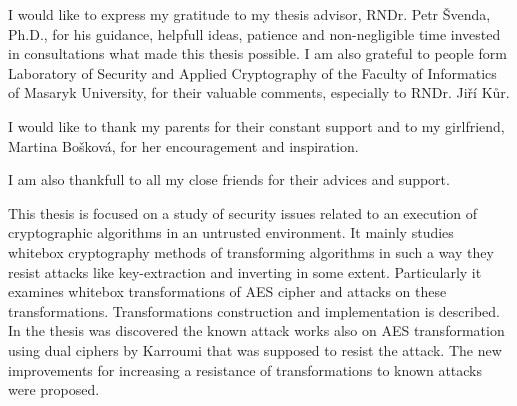 \documentclass[11pt,oneside,final]{fithesis2}
\begin{document}
\newenvironment{atribut_description}
{\begin{description}
  \renewcommand{\makelabel}[1]{\texttt{\hspace{6pt}##1 $-$}}%
  \setlength{\itemsep}{1pt}
  \setlength{\parskip}{0pt}
  \setlength{\parsep}{0pt}}
{\end{description}}
\renewcommand{\tiny}{\fontsize{7.7}{9.7}\selectfont}

\FrontMatter
\ThesisTitlePage


\begin{ThesisDeclaration}
\DeclarationText
\AdvisorName
\end{ThesisDeclaration}

\begin{ThesisThanks}
I would like to express my gratitude to my thesis advisor, RNDr. Petr Švenda, Ph.D., for his guidance, helpfull ideas, patience and 
non-negligible time invested in consultations what made this thesis possible. I am also grateful to people form 
Laboratory of Security and Applied Cryptography of the Faculty of Informatics of Masaryk University, for their valuable comments,
especially to RNDr. Jiří Kůr.

I would like to thank my parents for their constant support and to my girlfriend, Martina Bošková, for her encouragement and inspiration.

I am also thankfull to all my close friends for their advices and support.

    
\end{ThesisThanks}

\begin{ThesisAbstract}
This thesis is focused on a study of security issues related to an execution of cryptographic algorithms in an untrusted environment.
It mainly studies whitebox cryptography methods of transforming algorithms in such a way they resist attacks like key-extraction and inverting in some extent.
Particularly it examines whitebox transformations of AES cipher and attacks on these transformations. Transformations construction and implementation is described.
In the thesis was discovered the known attack works also on AES transformation using dual ciphers by Karroumi \citep{Karroumi:2010:PWA:2041036.2041060}
that was supposed to resist the attack.
The new improvements for increasing a resistance of transformations to known attacks were proposed.
\end{ThesisAbstract}
\end{document}
